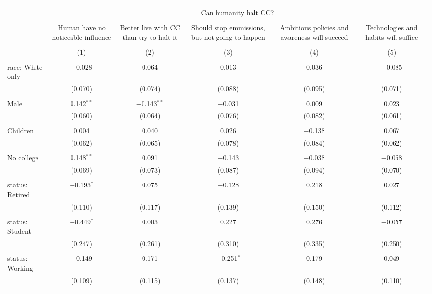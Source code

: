 
\begin{tabular}{@{\extracolsep{5pt}}lccccc} 
\\[-1.8ex]\hline 
\hline \\[-1.8ex] 
 & \multicolumn{5}{c}{Can humanity halt CC?} \\ 
\cline{2-6} 
\\[-1.8ex] & Human have no noticeable influence & Better live with CC than try to halt it & Should stop emmissions, but not going to happen & Ambitious policies and awareness will succeed & Technologies and habits will suffice \\ 
\\[-1.8ex] & (1) & (2) & (3) & (4) & (5)\\ 
\hline \\[-1.8ex] 
 race: White only & $-$0.028 & 0.064 & 0.013 & 0.036 & $-$0.085 \\ 
  & (0.070) & (0.074) & (0.088) & (0.095) & (0.071) \\ 
  & & & & & \\ 
 Male & 0.142$^{**}$ & $-$0.143$^{**}$ & $-$0.031 & 0.009 & 0.023 \\ 
  & (0.060) & (0.064) & (0.076) & (0.082) & (0.061) \\ 
  & & & & & \\ 
 Children & 0.004 & 0.040 & 0.026 & $-$0.138 & 0.067 \\ 
  & (0.062) & (0.065) & (0.078) & (0.084) & (0.062) \\ 
  & & & & & \\ 
 No college & 0.148$^{**}$ & 0.091 & $-$0.143 & $-$0.038 & $-$0.058 \\ 
  & (0.069) & (0.073) & (0.087) & (0.094) & (0.070) \\ 
  & & & & & \\ 
 status: Retired & $-$0.193$^{*}$ & 0.075 & $-$0.128 & 0.218 & 0.027 \\ 
  & (0.110) & (0.117) & (0.139) & (0.150) & (0.112) \\ 
  & & & & & \\ 
 status: Student & $-$0.449$^{*}$ & 0.003 & 0.227 & 0.276 & $-$0.057 \\ 
  & (0.247) & (0.261) & (0.310) & (0.335) & (0.250) \\ 
  & & & & & \\ 
 status: Working & $-$0.149 & 0.171 & $-$0.251$^{*}$ & 0.179 & 0.049 \\ 
  & (0.109) & (0.115) & (0.137) & (0.148) & (0.110) \\ 
  & & & & & \\ 

\end{tabular}
